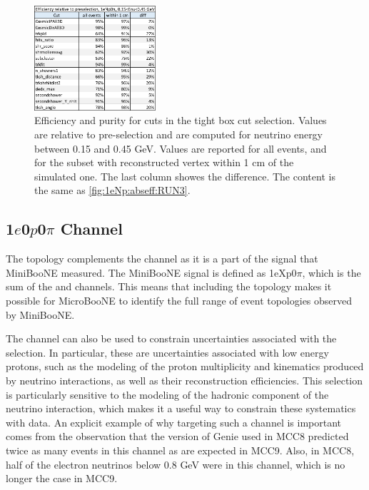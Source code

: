 \begin{figure}[H]
\begin{center}
\includegraphics[width=0.40\textwidth]{1eNp/cuts-eff-rel-presel.pdf}
\caption{\label{fig:1eNp:cutflow:rel} Efficiency and purity for cuts in the tight box cut \npsel selection. Values are relative to pre-selection and are computed for neutrino energy between 0.15 and 0.45 GeV. Values are reported for all events, and for the subset with reconstructed vertex within 1 cm of the simulated one. The last column showes the difference. The content is the same as \cref{fig:1eNp:abseff:RUN3}. }
\end{center}
\end{figure}


\subsection{1$e$0$p$0$\pi$ Channel }
\label{sec:nueselection:1e0p}

The \zpsel topology complements the \npsel channel as it is a part of the signal that MiniBooNE measured. The MiniBooNE signal is defined as 1eXp0$\pi$, which is the sum of the \npsel and \zpsel channels. This means that including the \zpsel topology makes it possible for MicroBooNE to identify the full range of event topologies observed by MiniBooNE.    

The \zpsel channel can also be used to constrain uncertainties associated with the \npsel selection.  In particular, these are uncertainties associated with low energy protons, such as the modeling of the proton multiplicity and kinematics produced by neutrino interactions, as well as their reconstruction efficiencies.  This selection is particularly sensitive to the modeling of the hadronic component of the neutrino interaction, which makes it a useful way to constrain these systematics with data. An explicit example of why targeting such a channel is important comes from the observation that the version of Genie used in MCC8 predicted twice as many events in this channel as are expected in MCC9.  Also, in MCC8, half of the electron neutrinos below 0.8 GeV were in this channel, which is no longer the case in MCC9.

